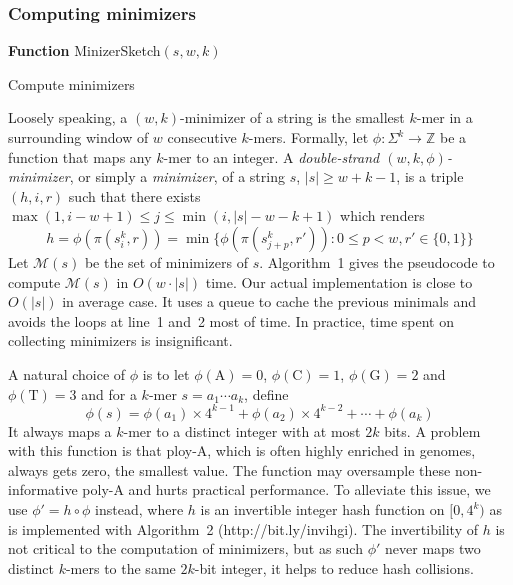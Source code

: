 \documentclass{bioinfo}
\begin{document}
\begin{methods}
\subsubsection{Computing minimizers}

\begin{algorithm}[tb]
\DontPrintSemicolon
\footnotesize
{}
\BlankLine
\textbf{Function} {\sc MinizerSketch}$(s,w,k)$
\caption{Compute minimizers}
\end{algorithm}

Loosely speaking, a $(w,k)$-minimizer of a string is the
smallest $k$-mer in a surrounding window of $w$ consecutive $k$-mers. Formally,
let $\phi:\Sigma^k\to\mathbb{Z}$ be a function that maps any $k$-mer to an integer.
A \emph{double-strand $(w,k,\phi)$-minimizer}, or simply a \emph{minimizer}, of a
string $s$, $|s|\ge w+k-1$, is a triple $(h,i,r)$ such that there exists
$\max(1,i-w+1)\le j\le\min(i,|s|-w-k+1)$ which renders
$$
h=\phi(\pi(s_i^k,r))=\min\big\{\phi(\pi(s_{j+p}^k,r')):0\le p<w,r'\in\{0,1\}\big\}
$$
Let $\mathcal{M}(s)$ be the set of minimizers of $s$.  Algorithm~1 gives the
pseudocode to compute $\mathcal{M}(s)$ in $O(w\cdot|s|)$ time.  Our actual
implementation is close to $O(|s|)$ in average case. It uses a queue to cache
the previous minimals and avoids the loops at line~1 and~2 most of time. In
practice, time spent on collecting minimizers is insignificant.

A natural choice of $\phi$ is to let $\phi(\mathrm{A})=0$,
$\phi(\mathrm{C})=1$, $\phi(\mathrm{G})=2$ and $\phi(\mathrm{T})=3$ and for a
$k$-mer $s=a_1\cdots a_k$, define
$$
\phi(s)=\phi(a_1)\times4^{k-1}+\phi(a_2)\times4^{k-2}+\cdots+\phi(a_k)
$$
It always maps a $k$-mer to a distinct integer with at most $2k$ bits. A problem with this function is
that ploy-A, which is often highly enriched in genomes, always gets zero, the
smallest value. The function may oversample these non-informative poly-A and
hurts practical performance. To alleviate this issue, we use $\phi'=h\circ\phi$
instead, where $h$ is an invertible integer hash function on $[0,4^k)$ as is
implemented with Algorithm~2 (http://bit.ly/invihgi). The invertibility of $h$
is not critical to the computation of minimizers, but as such $\phi'$ never
maps two distinct $k$-mers to the same $2k$-bit integer, it helps to reduce
hash collisions.


\end{methods}
\end{document}

